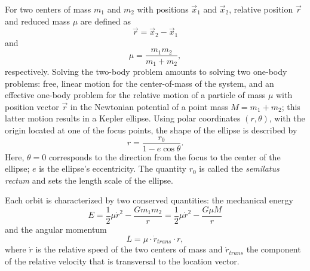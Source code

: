 \documentclass[11pt,twocolumn]{article}
\begin{document}
For two centers of mass $m_1$ and $m_2$ with positions $\vec{x}_1$ and $\vec{x}_2$, relative position $\vec{r}$ and reduced mass $\mu$ are defined as 
        \begin{equation}
        \vec{r} = \vec{x}_2 - \vec{x}_1
        \end{equation}
        and
        \begin{equation}
        \mu = \frac{m_1 m_2}{m_1 + m_2},
        \end{equation}
        respectively.
Solving the two-body problem amounts to solving two one-body problems: free, linear motion for the center-of-mass of the system, and an effective one-body problem for the relative motion of a particle of mass $\mu$ with position vector $\vec{r}$ in the Newtonian potential of a point mass $M=m_1+m_2$; this latter motion results in a Kepler ellipse. Using polar coordinates $(r,\theta)$, with the origin located at one of the focus points, the shape of the ellipse is described by 
   \begin{equation}
        r = \frac{r_0}{1 - e \cos\theta}.
        \label{EllipseEquation}
        \end{equation}
Here, $\theta=0$ corresponds to the direction from the focus to the center of the ellipse; $e$ is the ellipse's eccentricity.
The quantity $r_0$ is called the {\em semilatus rectum} and sets the length scale of the ellipse.

Each orbit is characterized by two conserved quantities: the mechanical energy
\begin{equation}
        E = \frac{1}{2}\mu \dot{r}^2 - \frac{G m_1 m_2}{r}=\frac{1}{2}\mu \dot{r}^2 - \frac{G \mu M}{r}
        \end{equation}
 and the angular momentum
 \begin{equation}
        L = \mu\cdot \dot{r}_{trans} \cdot r,
        \end{equation}
where $\dot{r}$ is the relative speed of the two centers of mass and $\dot{r}_{trans}$ the component of the relative velocity that is transversal to the location vector.
        
\end{document}
